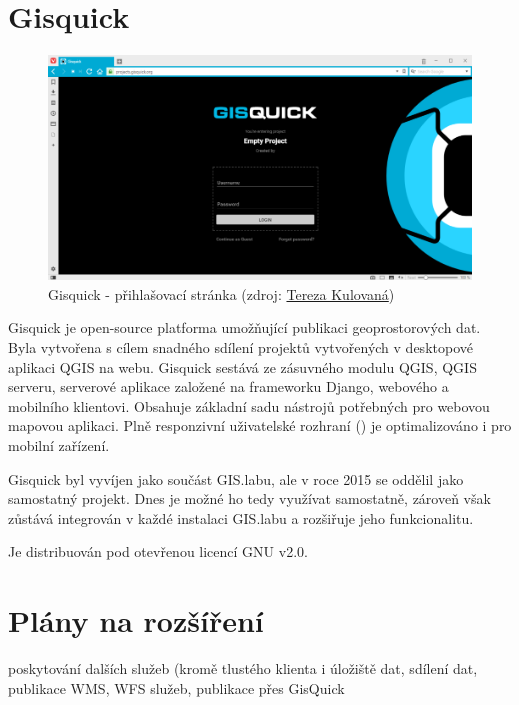 \section{Gisquick}

\begin{figure}[H] \centering
    \includegraphics[width=400pt]{./pictures/gisquick-welcome-screen.png}
    \caption[Gisquick - přihlašovací stránka]{Gisquick - přihlašovací stránka (zdroj:
	\href{}{Tereza Kulovaná})}
    \label{fig:gisquick-welcome}
\end{figure}

Gisquick je open-source platforma umožňující publikaci geoprostorových dat. Byla vytvořena s cílem snadného sdílení projektů vytvořených v desktopové aplikaci QGIS na webu. Gisquick sestává ze zásuvného modulu QGIS, QGIS serveru, serverové aplikace založené na frameworku Django, webového a mobilního klientovi. Obsahuje základní sadu nástrojů potřebných pro webovou mapovou aplikaci. Plně responzivní uživatelské rozhraní () je optimalizováno i pro mobilní zařízení.

Gisquick byl vyvíjen jako součást GIS.labu, ale v roce 2015 se oddělil jako samostatný projekt. Dnes je možné ho tedy využívat samostatně, zároveň však zůstává integrován v každé instalaci GIS.labu a rozšiřuje jeho funkcionalitu.

Je distribuován pod otevřenou licencí GNU  v2.0.

\section{Plány na rozšíření}
\label{vision}

poskytování dalších služeb (kromě tlustého klienta i úložiště dat, sdílení dat, publikace WMS, WFS služeb, publikace přes GisQuick